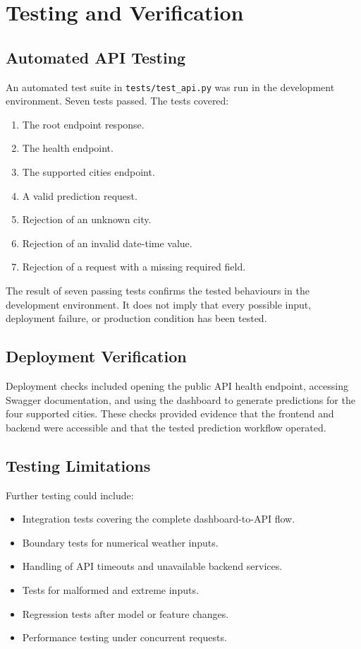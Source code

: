 \documentclass[12pt,a4paper]{article}
\begin{document}
	\section{Testing and Verification}
	
	\subsection{Automated API Testing}
	
	An automated test suite in \texttt{tests/test\_api.py} was run in
	the development environment. Seven tests passed. The tests covered:
	\begin{enumerate}[leftmargin=*]
		\item The root endpoint response.
		\item The health endpoint.
		\item The supported cities endpoint.
		\item A valid prediction request.
		\item Rejection of an unknown city.
		\item Rejection of an invalid date-time value.
		\item Rejection of a request with a missing required field.
	\end{enumerate}
	
	The result of seven passing tests confirms the tested behaviours
	in the development environment. It does not imply that every
	possible input, deployment failure, or production condition has
	been tested.
	
	\subsection{Deployment Verification}
	
	Deployment checks included opening the public API health endpoint,
	accessing Swagger documentation, and using the dashboard to
	generate predictions for the four supported cities. These checks
	provided evidence that the frontend and backend were accessible
	and that the tested prediction workflow operated.
	
	\subsection{Testing Limitations}
	
	Further testing could include:
	\begin{itemize}[leftmargin=*]
		\item Integration tests covering the complete dashboard-to-API flow.
		\item Boundary tests for numerical weather inputs.
		\item Handling of API timeouts and unavailable backend services.
		\item Tests for malformed and extreme inputs.
		\item Regression tests after model or feature changes.
		\item Performance testing under concurrent requests.
	\end{itemize}
	
\end{document}
